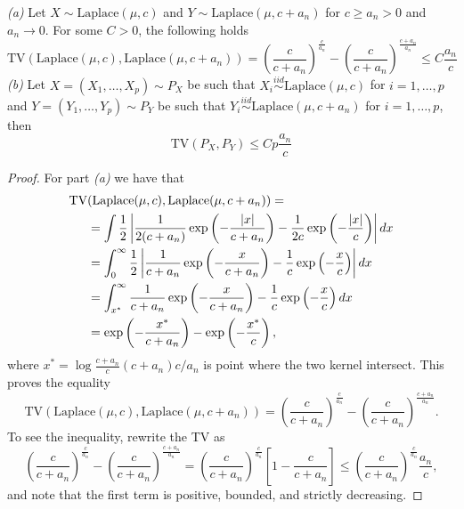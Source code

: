\documentclass[10pt,a4paper]{amsart}
\newcommand{\di}{{\rm d}}
\newcommand{\iidsim}{\overset{iid}{\sim}} %
\begin{document}
\begin{proposition}\label{prop:tv_laplace} \textit{(a)} Let $X\sim\text{Laplace}(\mu,c)$ and $Y\sim \text{Laplace}(\mu,c+a_n)$ for $c\geq a_n>0$ and $a_n \to 0$. For some $C>0$, the following holds
\[
\text{TV} (\text{Laplace}(\mu,c),\text{Laplace}(\mu,c+a_n)) = \left(\frac{c}{c+a_n}\right)^{\frac{c}{a_n}}-\left(\frac{c}{c+a_n}\right)^{\frac{c+a_n}{a_n}} \leq C\frac{a_n}{c}
\]  
\textit{(b)} Let $X=(X_1,\ldots, X_p) \sim P_X$ be such that $X_i\iidsim \text{Laplace}(\mu,c)$ for $i=1,\ldots,p$ and $Y=(Y_1,\ldots, Y_p)\sim P_Y$ be such that $Y_i\iidsim \text{Laplace}(\mu,c+a_n)$ for $i=1,\ldots,p$, then 
\[
\text{TV} (P_X,P_Y) \leq C p \frac{a_n}{c}
\]
\end{proposition}

\begin{proof} For part \textit{(a)} we have that
\begin{align*}
   \text{TV} &(\text{Laplace}(\mu,c),\text{Laplace}(\mu,c+a_n))  =\\
  & =\int\frac{1}{2}\left\vert \frac{1}{2 (c+a_n)} \exp\left( -\frac{|x|}{c+a_n}  \right) - \frac{1}{2 c} \exp\left( -\frac{|x|}{c}  \right) \right\vert \di x \\
   &=\int_0^{\infty}\frac{1}{2}\left\vert \frac{1}{ c+a_n} \exp\left( -\frac{x}{c+a_n}  \right) - \frac{1}{ c} \exp\left( -\frac{x}{c}  \right) \right\vert \di x\\
   &=\int_{x^*}^{\infty} \frac{1}{c+a_n} \exp\left( -\frac{x}{c+a_n}  \right) - \frac{1}{ c} \exp\left( -\frac{x}{c}  \right) \di x \\
   &=\exp\left( -\frac{x^*}{c+a_n} \right) - \exp\left( -\frac{x^*}{c}  \right),
\end{align*}
where $x^*=\log\frac{c+a_n}{c}(c+a_n)c/a_n$ is point where the two kernel intersect. This proves the equality
\[
\text{TV} (\text{Laplace}(\mu,c),\text{Laplace}(\mu,c+a_n)) = \left(\frac{c}{c+a_n}\right)^{\frac{c}{a_n}}-\left(\frac{c}{c+a_n}\right)^{\frac{c+a_n}{a_n}}.
\]
To see the inequality, rewrite the TV as 
\[
\left(\frac{c}{c+a_n}\right)^{\frac{c}{a_n}}-\left(\frac{c}{c+a_n}\right)^{\frac{c+a_n}{a_n}}=\left(\frac{c}{c+a_n}\right)^{\frac{c}{a_n}}\left[1 - \frac{c}{c+a_n}\right] \leq \left(\frac{c}{c+a_n}\right)^{\frac{c}{a_n}} \frac{a_n}{c},
\]
and note that the first term is positive, bounded, and strictly decreasing. 


\end{proof}
\end{document}
